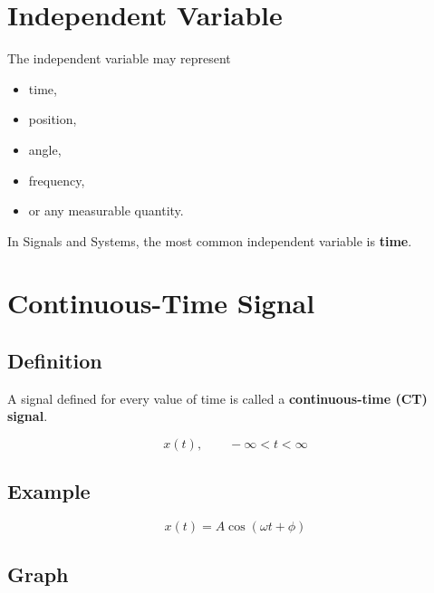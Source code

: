 
\section{Independent Variable}

The independent variable may represent

\begin{itemize}
\item time,
\item position,
\item angle,
\item frequency,
\item or any measurable quantity.
\end{itemize}

In Signals and Systems, the most common independent variable is \textbf{time}.


\section{Continuous-Time Signal}

\subsection{Definition}

A signal defined for every value of time is called a
\textbf{continuous-time (CT) signal}.

\[
x(t),\qquad -\infty<t<\infty
\]


\subsection{Example}

\[
x(t)=A\cos(\omega t+\phi)
\]


\subsection{Graph}

\begin{center}
\end{center}

